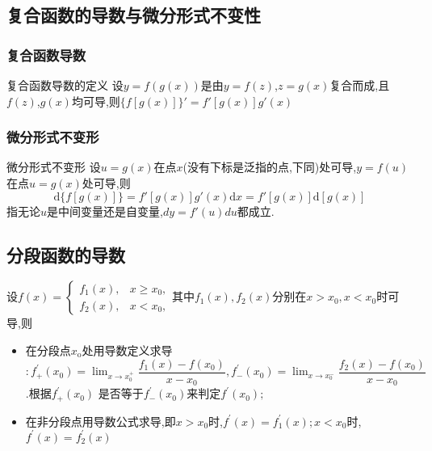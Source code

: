 \documentclass[8pt a4paper, oneside, UTF8]{ctexbook}  %
\begin{document}
\begin{sloppypar}
    \subsection{复合函数的导数与微分形式不变性}
    \subsubsection{复合函数导数}
    \begin{defn}{复合函数导数的定义}{}
        设$y = f ( g ( x ) )$是由$y=f(z)$,$z=g(x)$复合而成,且$f(z)$,$g(x)$均可导,则$\{f[g(x)]\}'=f'[g(x)]g'(x)$
    \end{defn}
    \subsubsection{微分形式不变形}
    \begin{defn}{微分形式不变形}{}
        设$u=g(x)$在点$x$(没有下标是泛指的点,下同)处可导,$y=f(u)$在点$u=g(x)$处可导,则
        $$
        \mathrm{d}\{f[g(x)]\}=f'[g(x)]g'(x)\mathrm{d}x=f'[g(x)]\mathrm{d}[g(x)]
        $$
        指无论$u$是中间变量还是自变量,$dy=f'(u)du$都成立.
    \end{defn}
    \subsection{分段函数的导数}
    设$f(x)=\begin{cases}f_1(x),&x\geqslant x_0,\\f_2(x),&x<x_{0},\end{cases}$其中$f_1(x),f_2(x)$分别在$x>x_0,x<x_0$时可导,则
    \begin{itemize}
        \item 在分段点$x_{\mathrm{o}}$处用导数定义求导$:f_+^{\prime}(x_0)=\lim_{x\to x_0^+}\dfrac{f_1(x)-f(x_0)}{x-x_0},f_-^{\prime}(x_0)=\lim_{x\to x_0^-}\dfrac{f_2(x)-f(x_0)}{x-x_0}$ .根据$f_+^{\prime}(x_0)$ 是否等于$f_-^{\prime}(x_0)$来判定$f^{\prime}(x_0);$
        \item 在非分段点用导数公式求导,即$x>x_0$时,$f^{\prime}(x)=f_1^{\prime}(x);x<x_0$时,$f^{\prime}(x)=f_2^{\prime}(x)$
    \end{itemize}

\end{sloppypar}
\end{document}
